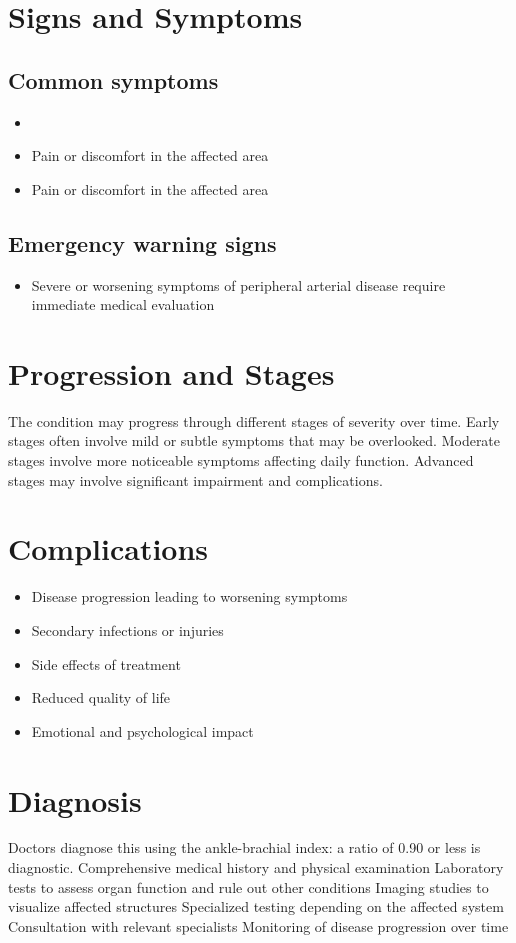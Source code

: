 \section{Signs and Symptoms}

\subsection{Common symptoms}
\begin{itemize}[noitemsep]
  \item \item Pain or discomfort in the affected area    \item Pain or discomfort in the affected area
  \end{itemize}

\subsection{Emergency warning signs}
\begin{itemize}[noitemsep]
  \item Severe or worsening symptoms of peripheral arterial disease require immediate medical evaluation
\end{itemize}
\section{Progression and Stages}
The condition may progress through different stages of severity over time. Early stages often involve mild or subtle symptoms that may be overlooked. Moderate stages involve more noticeable symptoms affecting daily function. Advanced stages may involve significant impairment and complications.
\section{Complications}
\begin{itemize}[noitemsep]
  \item Disease progression leading to worsening symptoms
  \item Secondary infections or injuries
  \item Side effects of treatment
  \item Reduced quality of life
  \item Emotional and psychological impact
\end{itemize}
\section{Diagnosis}
Doctors diagnose this using the ankle-brachial index: a ratio of 0.90 or less is diagnostic. Comprehensive medical history and physical examination Laboratory tests to assess organ function and rule out other conditions Imaging studies to visualize affected structures Specialized testing depending on the affected system Consultation with relevant specialists Monitoring of disease progression over time

